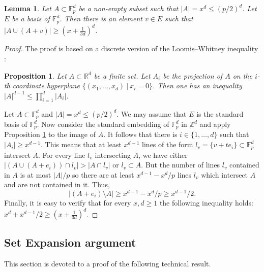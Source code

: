 \documentclass{daj}
\renewcommand{\le}{\leqslant}
\renewcommand{\ge}{\geqslant}
\newcommand{\R}{\mathbb R}
\newcommand{\Z}{\mathbb Z}
\newcommand{\FF}{\mathbb F}
\newtheorem{lemma}[theorem]{Lemma}
\newtheorem{prop}[theorem]{Proposition}
\theoremstyle{definition}
\theoremstyle{remark}
\theoremstyle{definition}
\theoremstyle{definition}
\begin{document}
\begin{lemma}\label{ad2}
Let $A \subset \FF_p^d$ be a non-empty subset such that $|A| = x^d \le (p/2)^d$. Let $E$ be a basis of $\FF_p^d$. Then there is an element $v \in E$ such that $|A \cup (A+v)| \ge (x + \frac{1}{3d})^d$.
\end{lemma}
\begin{proof}
The proof is based on a discrete version of the Loomis--Whitney inequality \cite{LW}:
\begin{prop}\label{LW}
Let $A \subset \R^d$ be a finite set. Let $A_i$ be the projection of $A$ on the $i$-th coordinate hyperplane $\{(x_1, \ldots, x_d)~|~x_i=0\}$. Then one has an inequality $|A|^{d-1} \le \prod_{i = 1}^d |A_i|$.
\end{prop}

Let $A \subset \FF_p^d$ and $|A| = x^d \le (p/2)^d$. We may assume that $E$ is the standard basis of $\FF_p^d$. %
Now consider the standard embedding of $\FF_p^d$ in $\Z^d$ and apply Proposition \ref{LW} to the image of $A$. It follows that there is $i \in \{1, \ldots, d\}$ such that $|A_i| \ge x^{d-1}$. This means that at least $x^{d-1}$ lines of the form $l_v = \{v + te_i\} \subset \FF_p^d$ intersect $A$. For every line $l_v$ intersecting $A$, we have either $|(A \cup (A+e_i)) \cap l_v| > |A \cap l_v|$ or $l_v \subset A$. But the number of lines $l_v$ contained in $A$ is at most $|A|/p$ %
so there are at least $x^{d-1} - x^d/p$ lines $l_v$ which intersect $A$ and are not contained in it. Thus,  
$$
|(A+e_i) \setminus A| \ge x^{d-1} - x^d/p \ge x^{d-1}/2.
$$
Finally, it is easy to verify that for every $x, d \ge 1$ the following inequality holds: $x^d + x^{d-1}/2 \ge (x + \frac{1}{3d})^d$. 
\end{proof}




\subsection{Set Expansion argument}\label{aldu}

This section is devoted to a proof of the following technical result.
\end{document}
